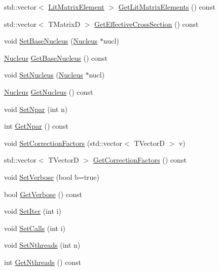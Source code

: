 \begin{DoxyCompactItemize}
\item 
std\-::vector$<$ \hyperlink{classLitMatrixElement}{Lit\-Matrix\-Element} $>$ \hyperlink{classCoulExMinFCN_a6518c89b7f351fff6535700877c66f07}{Get\-Lit\-Matrix\-Elements} () const 
\item 
std\-::vector$<$ T\-Matrix\-D $>$ \hyperlink{classCoulExMinFCN_ac5853fdc98470653111aef353b806166}{Get\-Effective\-Cross\-Section} () const 
\item 
void \hyperlink{classCoulExMinFCN_a3924912b5a05cb7966a569e11a6ab912}{Set\-Base\-Nucleus} (\hyperlink{classNucleus}{Nucleus} $\ast$nucl)
\item 
\hyperlink{classNucleus}{Nucleus} \hyperlink{classCoulExMinFCN_aca08dec223253bd86022ebf5358d837a}{Get\-Base\-Nucleus} () const 
\item 
void \hyperlink{classCoulExMinFCN_a4154d0ca6197aff0c360a18b846718bf}{Set\-Nucleus} (\hyperlink{classNucleus}{Nucleus} $\ast$nucl)
\item 
\hyperlink{classNucleus}{Nucleus} \hyperlink{classCoulExMinFCN_a04819cb7504e0d38a530923c3a9cdb87}{Get\-Nucleus} () const 
\item 
void \hyperlink{classCoulExMinFCN_aa7a93d1dbdf39271e8e7f1aedbbda147}{Set\-Npar} (int n)
\item 
int \hyperlink{classCoulExMinFCN_a558a013938717c422f66a9a955d78662}{Get\-Npar} () const 
\item 
void \hyperlink{classCoulExMinFCN_a6525e186ee14702162701414cda80fe1}{Set\-Correction\-Factors} (std\-::vector$<$ T\-Vector\-D $>$ v)
\item 
std\-::vector$<$ T\-Vector\-D $>$ \hyperlink{classCoulExMinFCN_a457c6cf81ad161d18c13e8bacd087a4a}{Get\-Correction\-Factors} () const 
\item 
void \hyperlink{classCoulExMinFCN_a04926d8c95503585735f0f79337376d1}{Set\-Verbose} (bool b=true)
\item 
bool \hyperlink{classCoulExMinFCN_acac974995031dd144882caee327f0284}{Get\-Verbose} () const 
\item 
void \hyperlink{classCoulExMinFCN_a4b5d3d75267cc59035d6697fceb3e8d3}{Set\-Iter} (int i)
\item 
void \hyperlink{classCoulExMinFCN_a70d61db9a8a7fee17671b637b3c0dee7}{Set\-Calls} (int i)
\item 
void \hyperlink{classCoulExMinFCN_a8fd85057cc72d10486ea25de6d37aa3d}{Set\-Nthreads} (int n)
\item 
int \hyperlink{classCoulExMinFCN_aee492209717d0c852ce0093a8f45b1d9}{Get\-Nthreads} () const 
\item 

\end{DoxyCompactItemize}
